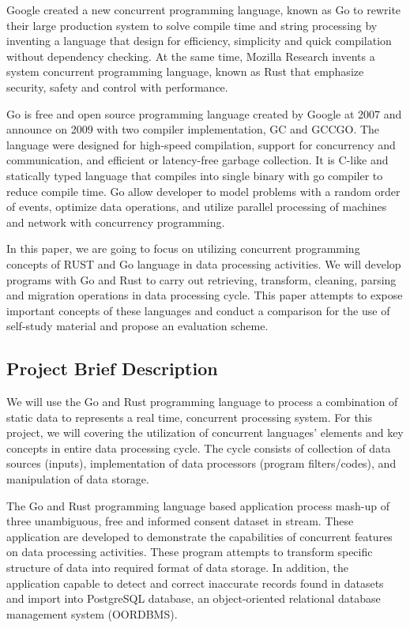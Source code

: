 Google created a new concurrent programming language, known as Go to rewrite their large production system to solve compile time and string processing by inventing a language that design for efficiency, simplicity and quick compilation without dependency checking. \cite{why-go} At the same time, Mozilla Research invents a system concurrent programming language, known as Rust that emphasize security, safety and control with performance. 

Go is free and open source programming language created by Google at 2007 and announce on 2009 \cite{golang-org} with two compiler implementation, GC and GCCGO. \cite{gcc-source} The language were designed for high-speed compilation, support for concurrency and communication, and efficient or latency-free garbage collection. It is C-like and statically typed language that compiles into single binary with go compiler to reduce compile time. Go allow developer to model problems with a random order of events, optimize data operations, and utilize parallel processing of machines and network with concurrency programming. \cite{pure-con-programming}

In this paper, we are going to focus on utilizing concurrent programming concepts of RUST and Go language in data processing activities. We will develop programs with Go and Rust to carry out retrieving, transform, cleaning, parsing and migration operations in data processing cycle. This paper attempts to expose important concepts of these languages and conduct a comparison for the use of self-study material and propose an evaluation scheme.
\pagebreak

\subsection{Project Brief Description}

We will use the Go and Rust programming language to process a combination of static data to represents a real time, concurrent processing system. For this project, we will covering the utilization of concurrent languages' elements and key concepts in entire data processing cycle. The cycle consists of collection of data sources (inputs), implementation of data processors (program filters/codes), and manipulation of data storage. 

The Go and Rust programming language based application process mash-up of three unambiguous, free and informed consent dataset in stream. These application are developed to demonstrate the capabilities of concurrent features on data processing activities. These program attempts to transform specific structure of data into required format of data storage. In addition, the application capable to detect and correct inaccurate records found in datasets and import into PostgreSQL database, an object-oriented relational database management system (OORDBMS). 

